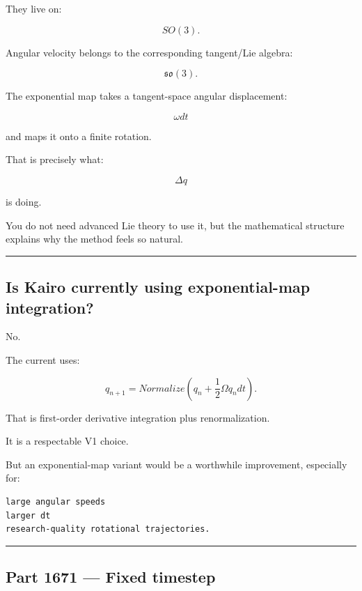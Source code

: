 They live on:

\[
SO(3).
\]

Angular velocity belongs to the corresponding tangent/Lie algebra:

\[
\mathfrak{so}(3).
\]

The exponential map takes a tangent-space angular displacement:

\[
\omega dt
\]

and maps it onto a finite rotation.

That is precisely what:

\[
\Delta q
\]

is doing.

You do not need advanced Lie theory to use it, but the mathematical structure explains why the method feels so natural.

\begin{center}\rule{0.5\linewidth}{0.5pt}\end{center}

\subsection{Is Kairo currently using exponential-map integration?}\label{06-engine-ii-ch037-is-kairo-currently-using-exponential-map-integration}

\hypertarget{06-engine-ii-ch037-is-kairo-currently-using-exponential-map-integration}{}

No.

The current  uses:

\[
q_{n+1}
=
Normalize(
q_n+
\frac12\Omega q_n dt
).
\]

That is first-order derivative integration plus renormalization.

It is a respectable V1 choice.

But an exponential-map variant would be a worthwhile improvement, especially for:

\begin{verbatim}
large angular speeds
larger dt
research-quality rotational trajectories.
\end{verbatim}

\begin{center}\rule{0.5\linewidth}{0.5pt}\end{center}

\subsection{Part 1671 --- Fixed timestep}\label{06-engine-ii-ch037-part-1671-fixed-timestep}

